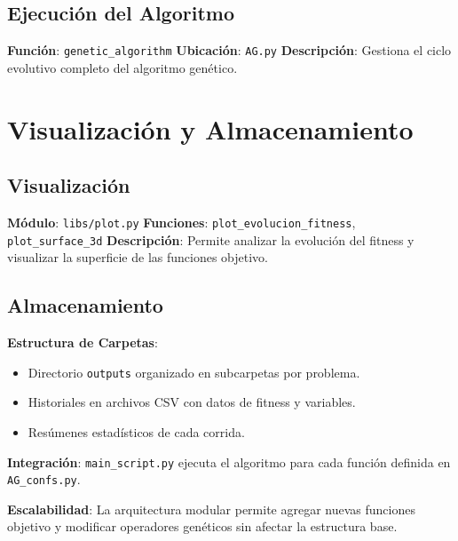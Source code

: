 \subsection{Ejecuci\'on del Algoritmo}
\textbf{Funci\'on}: \texttt{genetic\_algorithm}  
\textbf{Ubicaci\'on}: \texttt{AG.py}  
\textbf{Descripci\'on}: Gestiona el ciclo evolutivo completo del algoritmo gen\'etico.

\section{Visualizaci\'on y Almacenamiento}

\subsection{Visualizaci\'on}
\textbf{M\'odulo}: \texttt{libs/plot.py}  
\textbf{Funciones}: \texttt{plot\_evolucion\_fitness}, \texttt{plot\_surface\_3d}  
\textbf{Descripci\'on}: Permite analizar la evoluci\'on del fitness y visualizar la superficie de las funciones objetivo.

\subsection{Almacenamiento}
\textbf{Estructura de Carpetas}:
\begin{itemize}
    \item Directorio \texttt{outputs} organizado en subcarpetas por problema.
    \item Historiales en archivos CSV con datos de fitness y variables.
    \item Res\'umenes estad\'isticos de cada corrida.
\end{itemize}

\textbf{Integraci\'on}: \texttt{main\_script.py} ejecuta el algoritmo para cada funci\'on definida en \texttt{AG\_confs.py}.

\textbf{Escalabilidad}: La arquitectura modular permite agregar nuevas funciones objetivo y modificar operadores gen\'eticos sin afectar la estructura base.